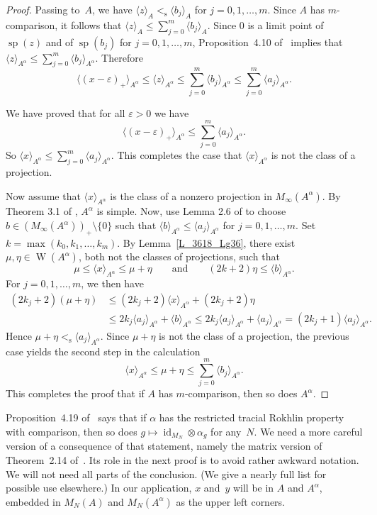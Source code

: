 \documentclass[10pt]{amsart}
\numberwithin{equation}{section}
\theoremstyle{definition}
\newcommand{\af}{\alpha}
\newcommand{\ep}{\varepsilon}
\newcommand{\id}{{\operatorname{id}}}
\newcommand{\spec}{{\operatorname{sp}}}
\newcommand{\W}{{\operatorname{W}}}
\newcommand{\andeqn}{\qquad {\mbox{and}} \qquad}
\newcommand{\pj}{projection}
\newcommand{\cc}[1]{\langle #1 \rangle}
\newcommand{\ccA}[1]{\langle #1 \rangle_A}
\newcommand{\les}{<_{\operatorname{s}}}
\newcommand{\ccAf}[1]{\langle #1 \rangle_{A^{\alpha}}}
\begin{document}
\begin{proof}
Passing to~$A$, we have $\ccA{z} \les \ccA{b_j}$ for $j = 0, 1, \ldots, m$.
Since $A$ has $m$-comparison, it follows that
$\ccA{z} \leq \sum_{j = 0}^m \ccA{b_j}$.
Since $0$ is a limit point of $\spec (z)$
and of $\spec (b_j)$ for $j = 0, 1, \ldots, m$,
Proposition~4.10 of~\cite{MohPhil2021TRP} implies that
$\ccAf{z} \leq \sum_{j = 0}^m \ccAf{b_j}$.
Therefore
\[
\ccAf{(x - \ep)_{+}}
 \leq \ccAf{z}
 \leq \sum_{j = 0}^m \ccAf{b_j}
 \leq \sum_{j = 0}^m \ccAf{a_j}.
\]

We have proved that for all $\ep > 0$ we have
\[
\ccAf{(x - \ep)_{+}} \leq \sum_{j = 0}^m \ccAf{a_j}.
\]
So $\ccAf{x} \leq \sum_{j = 0}^m \ccAf{a_j}$.
This completes the case that $\ccAf{x}$ is not the class of a \pj.

Now assume that $\cc{x}_{A^{\alpha}}$ is the class of a nonzero
projection in $M_{\infty} (A^{\alpha})$. By Theorem 3.1 of
\cite{MohPhil2021TRP}, $A^{\alpha}$ is simple. Now, use Lemma 2.6 of \cite{Phl40} to choose
$b \in (M_{\infty} (A^{\alpha}))_{+} \setminus \{0\}$ such that
$\cc{b}_{A^{\alpha}} \leq \cc{a_j}_{A^{\alpha}}$ for
$j = 0, 1, \hdots, m$.
Set $k = \max ( k_0, k_1, \ldots, k_m )$.
By Lemma~\ref{L_3618_Lg36}, there exist $\mu, \eta \in \W (A^{\alpha})$,
both not the classes of \pj{s},
such that
\[
\mu \leq \cc{x}_{A^{\alpha}} \leq \mu + \eta
\andeqn
(2 k + 2) \eta \leq \cc{b}_{A^{\alpha}}.
\]
For $j = 0, 1, \hdots, m$, we then have
\[
\begin{split}
(2 k_j + 2) (\mu + \eta)
& \leq (2 k_j + 2) \cc{x}_{A^{\alpha}} + (2 k_j + 2) \eta
\\
& \leq 2 k_j \cc{a_j}_{A^{\alpha}} + \cc{b}_{A^{\alpha}}
  \leq 2 k_j \cc{a_j}_{A^{\alpha}} + \cc{a_j}_{A^{\alpha}}
  = (2 k_j + 1) \cc{a_j}_{A^{\alpha}}.
\end{split}
\]
Hence $\mu + \eta \les \cc{a_j}_{A^{\alpha}}$.
Since $\mu + \eta$ is not the class of a \pj,
the previous case yields the second step in the calculation
\[
\cc{x}_{A^{\alpha}} \leq \mu + \eta \leq \sum_{j = 0}^m \cc{b_j}_{A^{\alpha}}.
\]
This completes the proof that if $A$ has
$m$-comparison, then so does $A^{\alpha}$.
\end{proof}


Proposition~4.19 of~\cite{MohPhil2021TRP} says that if $\af$
has the restricted tracial Rokhlin property with comparison,
then so does $g \mapsto \id_{M_N} \otimes \af_g$ for any~$N$.
We need a more careful version of a consequence of that statement,
namely the matrix version of Theorem~2.14 of~\cite{MohPhil2021TRP}.
Its role in the next proof is to avoid rather awkward notation.
We will not need all parts of the conclusion.
(We give a nearly full list for  possible use elsewhere.)
In our application, $x$ and~$y$ will be in $A$ and $A^{\af}$,
embedded in $M_N (A)$ and $M_N (A^{\alpha})$ as the upper left corners.
\end{document}
